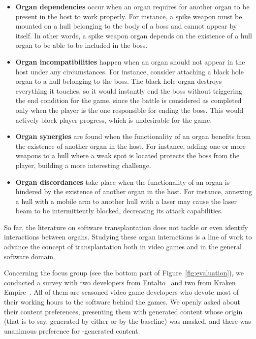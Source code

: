 \begin{itemize}
    
    \item \textbf{Organ dependencies} occur when an organ requires for another organ to be present in the host to work properly. For instance, a spike weapon must be mounted on a hull belonging to the body of a boss and cannot appear by itself. In other words, a spike weapon organ depends on the existence of a hull organ to be able to be included in the boss.
    
    \item \textbf{Organ incompatibilities} happen when an organ should not appear in the host under any circumstances. For instance, consider attaching a black hole organ to a hull belonging to the boss. The black hole organ destroys everything it touches, so it would instantly end the boss without triggering the end condition for the game, since the battle is considered as completed only when the player is the one responsible for ending the boss. This would actively block player progress, which is undesirable for the game.
    
    \item \textbf{Organ synergies} are found when the functionality of an organ benefits from the existence of another organ in the host. For instance, adding one or more weapons to a hull where a weak spot is located protects the boss from the player, building a more interesting challenge.
    
    \item \textbf{Organ discordances} take place when the functionality of an organ is hindered by the existence of another organ in the host. For instance, annexing a hull with a mobile arm to another hull with a laser may cause the laser beam to be intermittently blocked, decreasing its attack capabilities.
    
\end{itemize}

So far, the literature on software transplantation does not tackle or even identify interactions between organs. Studying these organ interactions is a line of work to advance the concept of  transplantation both in video games and in the general software domain.

Concerning the focus group (see the bottom part of Figure~\ref{fig:evaluation}), we conducted a survey with two developers from Entalto~\cite{entaltoweb} and two from Kraken Empire~\cite{krakenweb}. All of them are seasoned video game developers who devote most of their working hours to the software behind the games. We openly asked about their content preferences, presenting them with generated content whose origin (that is to say, generated by either \ApproachName{} or by the baseline) was masked, and there was unanimous preference for \ApproachName{}-generated content. 


